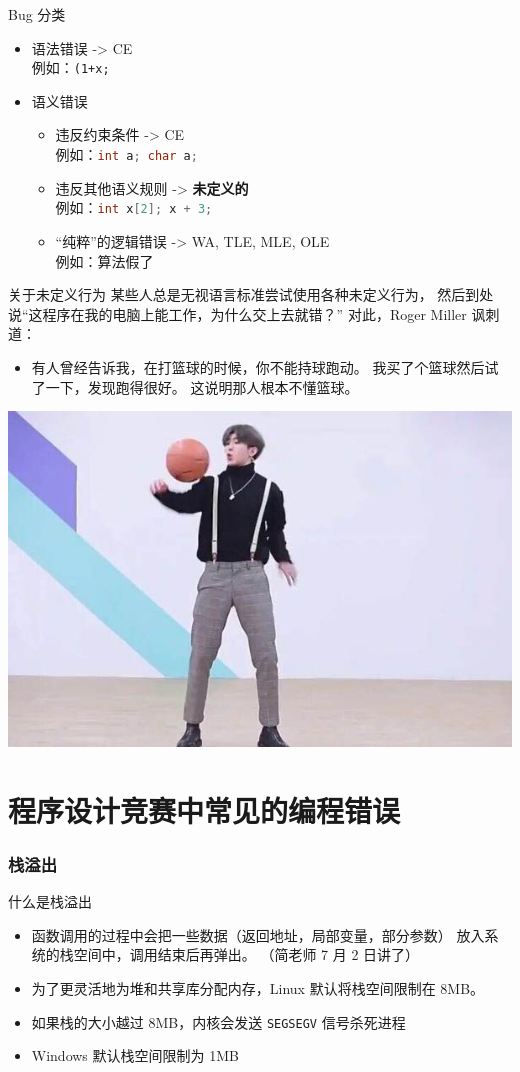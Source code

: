 \documentclass[10pt,mathserif]{beamer}%
\begin{document}
\begin{frame}[fragile]{Bug 分类}
	\begin{itemize}
		\item 语法错误 -> CE \\
			例如：\lstinline!(1+x;!
		\item 语义错误
			\begin{itemize}
				\item 违反约束条件 -> CE \\
					例如：\lstinline[language=C++]!int a; char a;!
				\item 违反其他语义规则 -> \textbf{未定义的} \\
					例如：\lstinline[language=C++]!int x[2]; x + 3;!
				\item “纯粹”的逻辑错误 -> WA, TLE, MLE, OLE \\
					例如：算法假了
			\end{itemize}
	\end{itemize}
\end{frame}

\begin{frame}{关于未定义行为}
	某些人总是无视语言标准尝试使用各种未定义行为，
	然后到处说“这程序在我的电脑上能工作，为什么交上去就错？”
	对此，Roger Miller 讽刺道：
	\begin{itemize}
		\item 有人曾经告诉我，在打篮球的时候，你不能持球跑动。
			我买了个篮球然后试了一下，发现跑得很好。
			这说明那人根本不懂篮球。
	\end{itemize}
	\pause
	\center
	\includegraphics[width=.5\textwidth]{img/cxk.jpg}
\end{frame}

\part{程序设计竞赛中常见的编程错误}

\section{栈溢出}
\begin{frame}{什么是栈溢出}
	\begin{itemize}
		\item 函数调用的过程中会把一些数据（返回地址，局部变量，部分参数）
			放入系统的栈空间中，调用结束后再弹出。
			\tiny（简老师 7 月 2 日讲了）
			\normalsize
		\item 为了更灵活地为堆和共享库分配内存，Linux 默认将栈空间限制在 8MB。
		\item 如果栈的大小越过 8MB，内核会发送 \lstinline!SEGSEGV!
			信号杀死进程
		\item Windows 默认栈空间限制为 1MB
	\end{itemize}
\end{frame}
\end{document}
